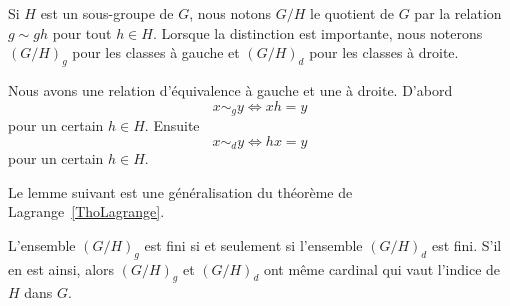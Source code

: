 Si \( H\) est un sous-groupe de  \( G\), nous notons \( G/H\) le quotient de $G$ par la relation \( g\sim gh\) pour tout \( h\in H\). Lorsque la distinction est importante, nous noterons \( (G/H)_g\) pour les classes à gauche et \( (G/H)_d\) pour les classes à droite.

Nous avons une relation d'équivalence à gauche et une à droite. D'abord
\begin{equation}
    x\sim_g y\Leftrightarrow xh=y
\end{equation}
pour un certain \( h\in H\). Ensuite
\begin{equation}
    x\sim_d y\Leftrightarrow hx=y
\end{equation}
pour un certain \( h\in H\).

Le lemme suivant est une généralisation du théorème de Lagrange~\ref{ThoLagrange}.

\begin{lemma}
    L'ensemble \( (G/H)_g\) est fini si et seulement si l'ensemble \( (G/H)_d\) est fini. S'il en est ainsi, alors \( (G/H)_g\) et \( (G/H)_d\) ont même cardinal qui vaut l'indice de \( H\) dans \( G\).
\end{lemma}

